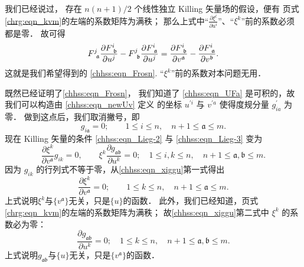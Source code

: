 我们已经说过， 存在 $n(n+1) / 2$ 个线性独立 Killing 矢量场的假设，便有
\pageref{chrg:eqn_kvm}页式\eqref{chrg:eqn_kvm}的左端的系数矩阵为满秩；
那么上式中“$\frac{\partial \xi^l}{\partial u^i} $”、“$\xi^k$”前的系数必须都是零．
故可得
\begin{equation}
    F^j_{\hphantom{j}\mathfrak{a}} \frac{\partial  F^{i}_{\hphantom{i}\mathfrak{b}}}{\partial u^j}
    -F^j_{\hphantom{j}\mathfrak{b}} \frac{\partial F^{i}_{\hphantom{i}\mathfrak{a}}}{\partial u^j}
    =\frac{\partial F^{i}_{\hphantom{i}\mathfrak{b}}}{\partial v^{\mathfrak{a}}}
    -\frac{\partial F^{i}_{\hphantom{i}\mathfrak{a}}}{\partial v^{\mathfrak{b}}}     .
\end{equation}
这就是我们希望得到的 \eqref{chhss:eqn_Frosn}.
“$\xi^k$”前的系数对本问题无用．


既然已经证明了\eqref{chhss:eqn_Frosn}，
我们知道了 \eqref{chhss:eqn_UFa} 是可积的，故我们可以构造由 \eqref{chhss:eqn_newUv} 定义
的坐标 $u^{\prime i}$ 与 $v^{\prime a}$ 使得度规分量 $g_{i a}^{\prime}$ 为零．
做到这点后，我们取消撇号，即
\begin{equation}
    g_{i \mathfrak{a}}=0 ; \qquad 1\leqslant i \leqslant n,\quad 
    n+1 \leqslant \mathfrak{a} \leqslant m.
\end{equation}
现在 Killing 矢量的条件 \eqref{chhss:eqn_Lieg-2} 与 \eqref{chhss:eqn_Lieg-3} 变为
\begin{equation}\label{chhss:eqn_xiggu}
    \frac{\partial \xi^k}{\partial v^{\mathfrak{a}}} g_{i k}=0, \qquad
    \xi^k \frac{\partial g_{\mathfrak{ab}}}{\partial u^k}=0 ; \quad 
    1\leqslant i,k \leqslant n,\quad  n+1 \leqslant \mathfrak{a},\mathfrak{b} \leqslant m.
\end{equation}
因为 $g_{i k}$ 的行列式不等于零，从\eqref{chhss:eqn_xiggu}第一式得出
\begin{equation}\label{chhss:eqn_xi-u}
    \frac{\partial \xi^k}{\partial v^{\mathfrak{a}}}=0 ; \qquad 
    1\leqslant k \leqslant n,\quad  n+1 \leqslant \mathfrak{a} \leqslant m.
\end{equation}
上式说明$\xi^k$与$\{v^\mathfrak{a}\}$无关，只是$\{u\}$的函数．
此外，我们已经知道，\pageref{chrg:eqn_kvm}页式\eqref{chrg:eqn_kvm}的左端的系数矩阵为满秩；
故\eqref{chhss:eqn_xiggu}第二式中 $\xi^k$ 的系数必为零：
\begin{equation}\label{chhss:eqn_gab-v}
    \frac{\partial g_{\mathfrak{ab}}}{\partial u^k}=0 ; \quad 
    1\leqslant k \leqslant n,\quad  n+1 \leqslant \mathfrak{a},\mathfrak{b} \leqslant m.
\end{equation}
上式说明$g_{\mathfrak{ab}}$与$\{u\}$无关，只是$\{v^\mathfrak{a}\}$的函数．


